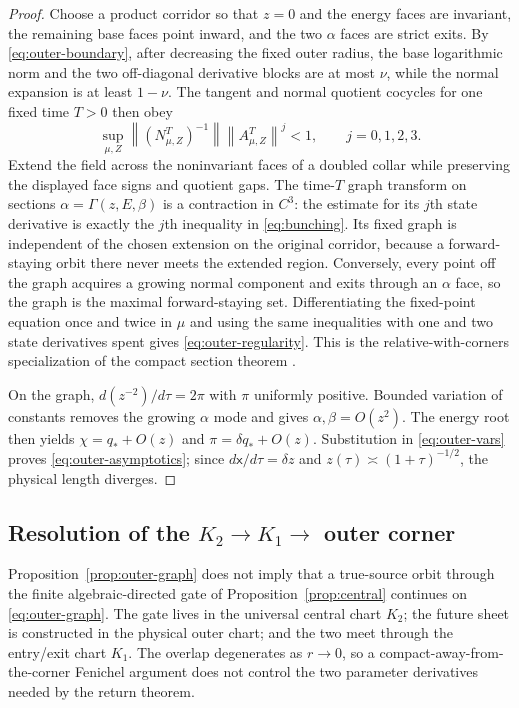 \documentclass[11pt,reqno]{amsart}
\numberwithin{equation}{section}
\theoremstyle{definition}
\theoremstyle{remark}
\newcommand{\norm}[1]{\left\lVert #1\right\rVert}
\begin{document}
\begin{proof}
Choose a product corridor so that $z=0$ and the energy faces are invariant,
the remaining base faces point inward, and the two $\alpha$ faces are strict
exits.  By \eqref{eq:outer-boundary}, after decreasing the fixed outer radius,
the base logarithmic norm and the two off-diagonal derivative blocks are at
most $\nu$, while the normal expansion is at least $1-\nu$.  The tangent and
normal quotient cocycles for one fixed time $T>0$ then obey
\begin{equation}\label{eq:bunching}
 \sup_{\mu,Z}\norm{(N^T_{\mu,Z})^{-1}}
                   \norm{A^T_{\mu,Z}}^j<1,\qquad j=0,1,2,3.
\end{equation}
Extend the field across the noninvariant faces of a doubled collar while
preserving the displayed face signs and quotient gaps.  The time-$T$ graph
transform on sections $\alpha=\Gamma(z,E,\beta)$ is a contraction in
$C^3$: the estimate for its $j$th state derivative is exactly the $j$th
inequality in \eqref{eq:bunching}.  Its fixed graph is independent of the
chosen extension on the original corridor, because a forward-staying orbit
there never meets the extended region.  Conversely, every point off the
graph acquires a growing normal component and exits through an $\alpha$ face,
so the graph is the maximal forward-staying set.  Differentiating the
fixed-point equation once and twice in $\mu$ and using the same inequalities
with one and two state derivatives spent gives
\eqref{eq:outer-regularity}.  This is the relative-with-corners specialization
of the compact section theorem
\cite{Fenichel1972,HirschPughShub1977}.

On the graph, $d(z^{-2})/d\tau=2\pi$ with $\pi$ uniformly positive.  Bounded
variation of constants removes the growing $\alpha$ mode and gives
$\alpha,\beta=O(z^2)$.  The energy root then yields
$\chi=q_*+O(z)$ and $\pi=\delta q_*+O(z)$.  Substitution in
\eqref{eq:outer-vars} proves \eqref{eq:outer-asymptotics}; since
$d\mathsf x/d\tau=\delta z$ and $z(\tau)\asymp(1+\tau)^{-1/2}$, the physical
length diverges.
\end{proof}

\subsection{\texorpdfstring{Resolution of the $K_2\to K_1\to$ outer
corner}{Resolution of the K2 to K1 to outer corner}}

Proposition~\ref{prop:outer-graph} does not imply that a true-source orbit
through the finite algebraic-directed gate of Proposition~\ref{prop:central}
continues on \eqref{eq:outer-graph}.  The gate lives in the universal central chart
$K_2$; the future sheet is constructed in the physical outer chart; and the
two meet through the entry/exit chart $K_1$.  The overlap degenerates as
$r\to0$, so a compact-away-from-the-corner Fenichel argument does not control
the two parameter derivatives needed by the return theorem.
\end{document}

